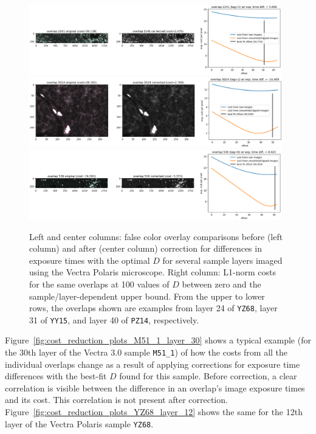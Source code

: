 \documentclass[letterpaper,11pt]{article}
\newcommand{\reffig}[1]{Figure~\ref{#1}}
\begin{document}
\begin{figure}[!ht]
\centering
\includegraphics[width=0.98\textwidth]{images/methods/cost_examples_polaris/overlay_comp_random_5023_offset=50.770}
\includegraphics[width=0.98\textwidth]{images/methods/cost_examples_polaris/overlay_comp_random_4697_offset=49.636}
\includegraphics[width=0.98\textwidth]{images/methods/cost_examples_polaris/overlay_comp_random_1916_offset=50.424}
\caption{\footnotesize Left and center columns: false color overlay comparisons before (left column) and after (center column) correction for differences in exposure times with the optimal $D$ for several sample layers imaged using the Vectra Polaris microscope. Right column: L1-norm costs for the same overlaps at 100 values of $D$ between zero and the sample/layer-dependent upper bound. From the upper to lower rows, the overlaps shown are examples from layer 24 of \texttt{YZ68}, layer 31 of \texttt{YY15}, and layer 40 of \texttt{PZ14}, respectively.}
\label{fig:overlap_cost_examples_polaris_2}
\end{figure}

\reffig{fig:cost_reduction_plots_M51_1_layer_30} shows a typical example (for the 30th layer of the Vectra 3.0 sample \texttt{M51\_1}) of how the costs from all the individual overlaps change as a result of applying corrections for exposure time differences with the best-fit $D$ found for this sample. Before correction, a clear correlation is visible between the difference in an overlap's image exposure times and its cost. This correlation is not present after correction. \reffig{fig:cost_reduction_plots_YZ68_layer_12} shows the same for the 12th layer of the Vectra Polaris sample \texttt{YZ68}.
\end{document}
